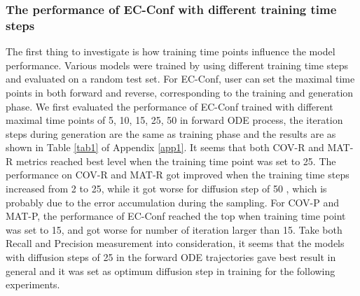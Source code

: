 \documentclass{article} %
\begin{document}
\subsubsection{The performance of EC-Conf with different training time steps}
The first thing to investigate is how training time points influence the model performance. Various models were trained by using different training time steps and evaluated on a random  test set. For EC-Conf, user can set the maximal time points in both forward and reverse, corresponding to the training and generation phase. We first evaluated the performance of EC-Conf trained with different maximal time points of 5, 10, 15, 25, 50 in forward ODE process, the iteration steps during generation are the same as training phase and the results are as shown in Table \ref{tab1} of Appendix \ref{app1}. It seems that both COV-R and MAT-R metrics reached best level when the training time point was set to 25. The performance on COV-R and MAT-R got improved when the training time steps increased from 2 to 25, while it got worse for diffusion step of 50 , which is probably due to the error accumulation during the sampling. For COV-P and MAT-P, the performance of EC-Conf reached the top when training time point was set to 15, and got worse for number of iteration larger than 15. Take both Recall and Precision measurement into consideration, it seems that the models with diffusion steps of 25 in the forward ODE trajectories gave best result in general and it was set as optimum diffusion step in training for the following experiments.
\end{document}
